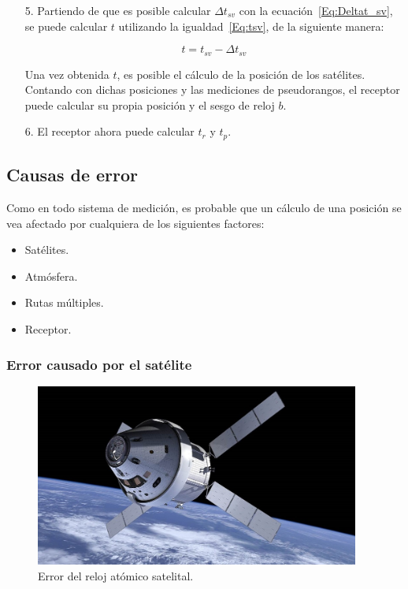 {\begin{itemize}
y $\Delta n$ es una constante dada por la observación.\\

\item[5.] Partiendo de que es posible calcular $\Delta t_{sv}$ con la ecuación~\ref{Eq:Deltat_sv}, se puede calcular $t$ utilizando la igualdad~\ref{Eq:tsv}, de la siguiente manera:

\begin{equation}
\label{t}
t = t_{sv} - \Delta t_{sv}
\end{equation}

Una vez obtenida $t$, es posible el cálculo de la posición de los satélites. Contando con dichas posiciones y las mediciones de pseudorangos, el receptor puede calcular su propia posición y el sesgo de reloj $b$.

\item[6.] El receptor ahora puede calcular $t_r$ y $t_p$.
\end{itemize}
}
\subsection{Causas de error}\label{subsec:CauErr}

Como en todo sistema de medición, es probable que un cálculo de una posición se vea afectado por cualquiera de los siguientes factores: 

\begin{itemize}
	\item Satélites.
	\item Atmósfera.
	\item Rutas múltiples.
	\item Receptor.
\end{itemize} 

\subsubsection{Error causado por el satélite}

\begin{figure}[H]
\centering
\includegraphics[width=0.95\textwidth]{Figures/Sat}
\caption[Error del reloj atómico satelital.]{Error del reloj atómico satelital\footnotemark.}
\label{fig:ErrSat}
\end{figure}

